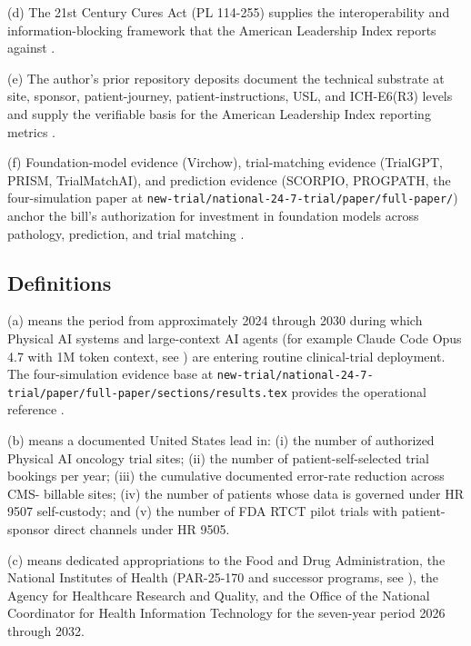 (d) The 21st Century Cures Act (PL 114-255) supplies the
interoperability and information-blocking framework that the
American Leadership Index reports against
\cite{rank1_cures_act_2016}.

(e) The author's prior repository deposits document the technical
substrate at site, sponsor, patient-journey, patient-instructions,
USL, and ICH-E6(R3) levels and supply the verifiable basis for the
American Leadership Index reporting metrics
\cite{kawchak_2026_19176370, kawchak_2026_19119939,
kawchak_2026_19396256, kawchak_2026_18810541,
kawchak_2026_18778219, kawchak_2026_18973368}.

(f) Foundation-model evidence (Virchow), trial-matching evidence
(TrialGPT, PRISM, TrialMatchAI), and prediction evidence (SCORPIO,
PROGPATH, the four-simulation paper at
\texttt{new-trial/national-24-7-trial/paper/full-paper/}) anchor the
bill's authorization for investment in foundation models
across pathology, prediction, and trial matching
\cite{vorontsov2024virchow, jin2024trialgpt, gupta2024prism,
abdallah2026trialmatchai, kawchak_2026_19994945}.

\subsection{Definitions}

\hspace{0.5cm} (a)  means the period
from approximately 2024 through 2030 during which Physical AI
systems and large-context AI agents (for example Claude Code Opus
4.7 with 1M token context, see \cite{claude_opus_47}) are entering
routine clinical-trial deployment. The four-simulation evidence
base at
\texttt{new-trial/national-24-7-trial/paper/full-paper/sections/results.tex}
provides the operational reference \cite{kawchak_2026_19994945}.

(b)  means a documented United States
lead in:
(i) the number of authorized Physical AI oncology trial sites;
(ii) the number of patient-self-selected trial bookings per year;
(iii) the cumulative documented error-rate reduction across CMS-
billable sites;
(iv) the number of patients whose data is governed under HR 9507
self-custody; and
(v) the number of FDA RTCT pilot trials with patient-sponsor
direct channels under HR 9505.

(c)  means dedicated appropriations to
the Food and Drug Administration, the National Institutes of
Health (PAR-25-170 and successor programs, see
\cite{nih_par25_170_dht_endpoints}), the Agency for Healthcare
Research and Quality, and the Office of the National Coordinator
for Health Information Technology for the seven-year period 2026
through 2032.

